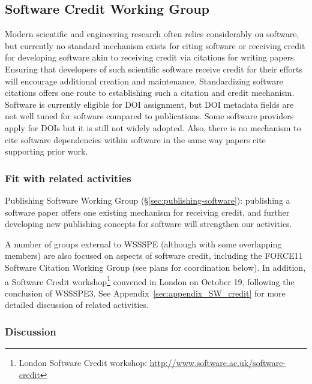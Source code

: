 \subsection{Software Credit Working Group}
\label{sec:software-credit}


Modern scientific and engineering research often relies considerably on software, 
but currently no standard mechanism exists for citing software or receiving 
credit for developing software akin to receiving credit via citations for 
writing papers. Ensuring that developers of such scientific software receive 
credit for their efforts will encourage additional creation and maintenance. 
Standardizing software citations offers one route to establishing such a
citation and credit mechanism. Software is currently eligible for DOI
assignment, but DOI metadata fields are not well tuned for software compared to
publications. Some software providers apply for DOIs but it is still not widely
adopted. Also, there is no mechanism to cite software dependencies within
software in the same way papers cite supporting prior work.

\subsubsection{Fit with related activities}

Publishing Software Working Group (\S\ref{sec:publishing-software}): publishing
a software paper offers one existing mechanism for receiving credit, and further
developing new publishing concepts for software will strengthen our activities.

A number of groups external to WSSSPE (although with some overlapping members)
are also focused on aspects of software credit, including the FORCE11 Software
Citation Working Group (see plans for coordination below). In addition, a
Software Credit workshop\footnote{London Software Credit workshop:
\url{http://www.software.ac.uk/software-credit}} convened in London on October
19, following the conclusion of WSSSPE3. See
Appendix~\ref{sec:appendix_SW_credit} for more detailed discussion of related
activities.

\subsubsection{Discussion}

